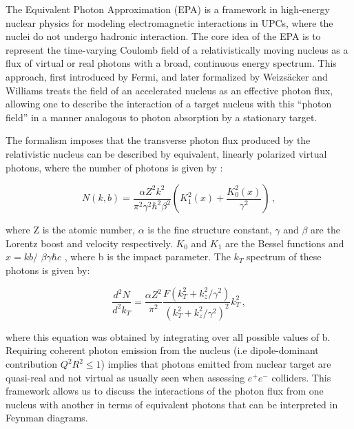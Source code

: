 
The Equivalent Photon Approximation (EPA) is a framework in high-energy nuclear physics for modeling electromagnetic interactions in UPCs, where the nuclei do not undergo hadronic interaction. The core idea of the EPA is to represent the time-varying Coulomb field of a relativistically moving nucleus as a flux of virtual or real photons with a broad, continuous energy spectrum. 
This approach, first introduced by Fermi, and later formalized by Weizsäcker and Williams \cite{pshenichnov_electromagnetic_2011} treats the field of an accelerated nucleus as an effective photon flux, allowing one to describe the interaction of a target nucleus with this ``photon field'' in a manner analogous to photon absorption by a stationary target.

The formalism imposes that the transverse photon flux produced by the relativistic nucleus can be described by equivalent, linearly polarized virtual photons, where the number of photons is given by \cite{klein_photonuclear_2020}:

\begin{equation}\label{eq:epa_general}
N(k,b) = \frac{ \alpha Z^2 k^2}{\pi^2\gamma^2\hbar^2\beta^2}\left( K_1^2(x) + \frac{K_0^2(x)}{\gamma^2} \right) \,,
\end{equation}

where Z is the atomic number, $\alpha$ is the fine structure constant, $\gamma$ and $\beta$ are the Lorentz boost and velocity respectively. $K_0$ and $K_1$ are the Bessel functions  and 
$x = kb / $ $ \beta \gamma \hbar c $ , where b is the impact parameter. The $k_{T}$ spectrum of these photons is given by:

\begin{equation}\label{eq:epa_kt_spectrum}
    \frac{d^2 N}{d^2 k_T} = \frac{\alpha Z^2}{\pi^2} \frac{F(k_T^2 + k_z^2/\gamma^2)}{(k_T^2 + k_z^2/\gamma^2)^2} k_T^2 \,,
\end{equation}

where this equation was obtained by integrating over all possible values of b. Requiring coherent photon emission from the nucleus (i.e dipole-dominant contribution $Q^2R^2 \leq 1$) implies that photons emitted from nuclear target are quasi-real and not virtual as usually seen when assessing $e^{+}e^{-}$ colliders. This framework allows us to discuss the interactions of the photon flux from one nucleus with another in terms of equivalent photons that can be interpreted in Feynman diagrams.
